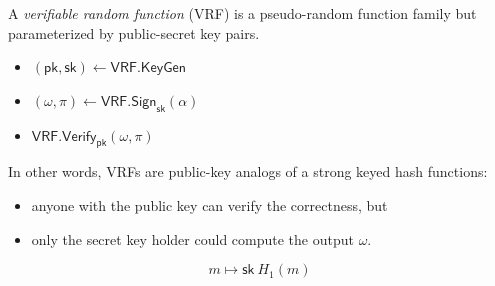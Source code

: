 \documentclass[fleqn,xcolor={usenames,dvipsnames},notes,aspectratio=169]{beamer} %
\newcommand{\algo}[1]{\ensuremath{\mathsf{#1}}}
\newcommand{\VRF}{\algo{VRF}}
\newcommand{\Sign}{\algo{Sign}}
\newcommand{\Verify}{\algo{Verify}}
\newcommand{\KeyGen}{\algo{KeyGen}}
\newcommand{\sk}{\ensuremath{\mathsf{sk}}}
\newcommand{\pk}{\ensuremath{\mathsf{pk}}}
\begin{document}
\begin{frame}

A {\em verifiable random function} (VRF) is a pseudo-random function family but \\
parameterized by public-secret key pairs.  
\begin{itemize}
\item $(\pk,\sk) \leftarrow \VRF.\KeyGen$
\item $(\omega,\pi) \leftarrow \VRF.\Sign_{\sk}(\alpha)$
\item $\VRF.\Verify_{\pk}(\omega,\pi)$
\end{itemize}

\medskip

In other words, VRFs are public-key analogs of a strong keyed hash functions: %
\begin{itemize}
\item anyone with the public key can verify the correctness, but
\item only the secret key holder could compute the output $\omega$.
\end{itemize}

\pause\bigskip

$$ m \mapsto \sk \ H_1(m) $$


\end{frame}
\end{document}
